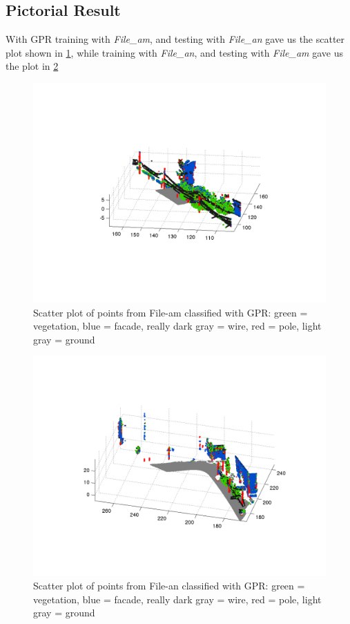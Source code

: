 \documentclass[letterpaper]{article}
\begin{document}
\subsection*{Pictorial Result}
With GPR training with \textit{File\_am}, and testing with \textit{File\_an} gave us the scatter plot shown in \ref{Fig_GPR1}, while training with \textit{File\_an}, and testing with \textit{File\_am} gave us the plot in \ref{Fig_GPR2}
\begin{figure}
\includegraphics[width=\linewidth]{gpr_trainam_testan.png}
\caption{Scatter plot of points from File-am classified with GPR: green = vegetation, blue = facade, really dark gray = wire, red = pole, light gray = ground}
\label{Fig_GPR1}
\end{figure}
\begin{figure}
\includegraphics[width=\linewidth]{gpr_trainan_testam.png}
\caption{Scatter plot of points from File-an classified with GPR: green = vegetation, blue = facade, really dark gray = wire, red = pole, light gray = ground}
\label{Fig_GPR2}
\end{figure}
\end{document}

